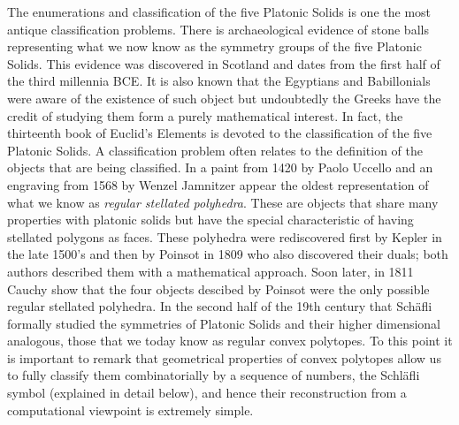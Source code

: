

The enumerations and classification of the five Platonic Solids is one the most antique classification problems.
There is archaeological evidence of stone balls representing what we now know as  the symmetry groups of the five Platonic Solids.
This evidence was discovered in Scotland and dates from the first half of the third millennia BCE.
It is also known that the Egyptians and Babillonials were aware of the existence of such object but undoubtedly the Greeks have the credit of studying them form a purely mathematical interest.
In fact, the thirteenth book of Euclid’s Elements is devoted to the classification of the five Platonic Solids.
A classification problem often relates to the definition of the objects that are being classified. In a paint from 1420 by Paolo Uccello and an engraving from 1568 by Wenzel Jamnitzer appear the oldest representation of what we know as \emph{regular stellated polyhedra}. These are objects that share many properties with platonic solids but have the special characteristic of having stellated polygons as faces.
These polyhedra were rediscovered first by Kepler in the late 1500’s and then by Poinsot in 1809 who also discovered their duals; both authors described them with a mathematical approach. Soon later, in 1811 Cauchy show that the four objects descibed by Poinsot were the only possible regular stellated polyhedra.
In the second half of the 19th century that Schäfli formally studied the symmetries of Platonic Solids and their higher dimensional analogous, those that we today know as regular convex polytopes. To this point it is important to remark that geometrical properties of convex polytopes allow us to fully classify them combinatorially by a sequence of numbers, the Schläfli symbol (explained in detail below), and hence their reconstruction from a computational viewpoint is extremely simple.

